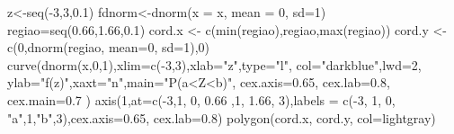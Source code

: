 \documentclass[
  letterpaper,
  DIV=11,
  numbers=noendperiod]{scrartcl}
\newenvironment{Shaded}{\begin{snugshade}}{\end{snugshade}}
\newcommand{\AttributeTok}[1]{\textcolor[rgb]{0.40,0.45,0.13}{#1}}
\newcommand{\DecValTok}[1]{\textcolor[rgb]{0.68,0.00,0.00}{#1}}
\newcommand{\FloatTok}[1]{\textcolor[rgb]{0.68,0.00,0.00}{#1}}
\newcommand{\FunctionTok}[1]{\textcolor[rgb]{0.28,0.35,0.67}{#1}}
\newcommand{\NormalTok}[1]{\textcolor[rgb]{0.00,0.23,0.31}{#1}}
\newcommand{\OtherTok}[1]{\textcolor[rgb]{0.00,0.23,0.31}{#1}}
\newcommand{\SpecialCharTok}[1]{\textcolor[rgb]{0.37,0.37,0.37}{#1}}
\newcommand{\StringTok}[1]{\textcolor[rgb]{0.13,0.47,0.30}{#1}}
\begin{document}
\begin{Shaded}
\begin{Highlighting}[]
\NormalTok{z}\OtherTok{\textless{}{-}}\FunctionTok{seq}\NormalTok{(}\SpecialCharTok{{-}}\DecValTok{3}\NormalTok{,}\DecValTok{3}\NormalTok{,}\FloatTok{0.1}\NormalTok{) }
\NormalTok{fdnorm}\OtherTok{\textless{}{-}}\FunctionTok{dnorm}\NormalTok{(}\AttributeTok{x =}\NormalTok{ x, }\AttributeTok{mean =} \DecValTok{0}\NormalTok{, }\AttributeTok{sd=}\DecValTok{1}\NormalTok{)   }
\NormalTok{regiao}\OtherTok{=}\FunctionTok{seq}\NormalTok{(}\FloatTok{0.66}\NormalTok{,}\FloatTok{1.66}\NormalTok{,}\FloatTok{0.1}\NormalTok{)}
\NormalTok{cord.x }\OtherTok{\textless{}{-}} \FunctionTok{c}\NormalTok{(}\FunctionTok{min}\NormalTok{(regiao),regiao,}\FunctionTok{max}\NormalTok{(regiao))}
\NormalTok{cord.y }\OtherTok{\textless{}{-}} \FunctionTok{c}\NormalTok{(}\DecValTok{0}\NormalTok{,}\FunctionTok{dnorm}\NormalTok{(regiao, }\AttributeTok{mean=}\DecValTok{0}\NormalTok{, }\AttributeTok{sd=}\DecValTok{1}\NormalTok{),}\DecValTok{0}\NormalTok{) }
\FunctionTok{curve}\NormalTok{(}\FunctionTok{dnorm}\NormalTok{(x,}\DecValTok{0}\NormalTok{,}\DecValTok{1}\NormalTok{),}\AttributeTok{xlim=}\FunctionTok{c}\NormalTok{(}\SpecialCharTok{{-}}\DecValTok{3}\NormalTok{,}\DecValTok{3}\NormalTok{),}\AttributeTok{xlab=}\StringTok{"z"}\NormalTok{,}\AttributeTok{type=}\StringTok{"l"}\NormalTok{, }
      \AttributeTok{col=}\StringTok{"darkblue"}\NormalTok{,}\AttributeTok{lwd=}\DecValTok{2}\NormalTok{, }\AttributeTok{ylab=}\StringTok{"f(z)"}\NormalTok{,}\AttributeTok{xaxt=}\StringTok{"n"}\NormalTok{,}\AttributeTok{main=}\StringTok{"P(a\textquotesingle{}\textless{}Z\textless{}b\textquotesingle{})"}\NormalTok{,}
      \AttributeTok{cex.axis=}\FloatTok{0.65}\NormalTok{, }\AttributeTok{cex.lab=}\FloatTok{0.8}\NormalTok{, }\AttributeTok{cex.main=}\FloatTok{0.7}\NormalTok{ ) }
\FunctionTok{axis}\NormalTok{(}\DecValTok{1}\NormalTok{,}\AttributeTok{at=}\FunctionTok{c}\NormalTok{(}\SpecialCharTok{{-}}\DecValTok{3}\NormalTok{,}\DecValTok{1}\NormalTok{, }\DecValTok{0}\NormalTok{, }\FloatTok{0.66}\NormalTok{ ,}\DecValTok{1}\NormalTok{, }\FloatTok{1.66}\NormalTok{, }\DecValTok{3}\NormalTok{),}\AttributeTok{labels =}
       \FunctionTok{c}\NormalTok{(}\SpecialCharTok{{-}}\DecValTok{3}\NormalTok{, }\DecValTok{1}\NormalTok{, }\DecValTok{0}\NormalTok{, }\StringTok{"a\textquotesingle{}"}\NormalTok{,}\DecValTok{1}\NormalTok{,}\StringTok{"b\textquotesingle{}"}\NormalTok{,}\DecValTok{3}\NormalTok{),}\AttributeTok{cex.axis=}\FloatTok{0.65}\NormalTok{, }\AttributeTok{cex.lab=}\FloatTok{0.8}\NormalTok{) }
\FunctionTok{polygon}\NormalTok{(cord.x, cord.y, }\AttributeTok{col=}\StringTok{\textquotesingle{}lightgray\textquotesingle{}}\NormalTok{)}
\end{Highlighting}
\end{Shaded}
\end{document}

